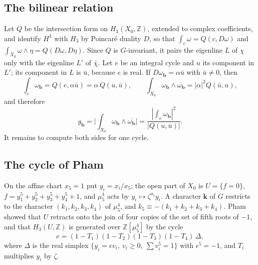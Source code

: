 \documentclass[11pt]{amsart}
\theoremstyle{definition}
\theoremstyle{remark}
\newcommand{\Z}{\mathbb{Z}}
\newcommand{\bb}{\mathbf{b}}
\begin{document}
\subsection{The bilinear relation}

Let $Q$ be the intersection form on $H_3(X_0,\Z)$, extended to complex
coefficients, and identify $H^3$ with $H_3$ by Poincar\'e duality $D$, so
that $\int_c\omega=Q(c,D\omega)$ and $\int_{X_0}\omega\wedge\eta=
Q(D\omega,D\eta)$. Since $Q$ is $G$-invariant, it pairs the eigenline $L$ of
$\chi$ only with the eigenline $L'$ of $\bar\chi$. Let $e$ be an integral
cycle and $u$ its component in $L'$; its component in $L$ is $\bar u$,
because $e$ is real. If $D\omega_{\bb}=\alpha\bar u$ with $\bar u\ne0$, then
\[
\int_e\omega_{\bb}=Q(e,\alpha\bar u)=\alpha\,Q(u,\bar u),\qquad
\int_{X_0}\omega_{\bb}\wedge\overline{\omega_{\bb}}=|\alpha|^2Q(\bar u,u),
\]
and therefore
\begin{equation}\label{eq:bilinear}
g_{\bb}=\Big|\int_{X_0}\omega_{\bb}\wedge\overline{\omega_{\bb}}\Big|
=\frac{|\int_e\omega_{\bb}|^2}{|Q(u,\bar u)|}.
\end{equation}
It remains to compute both sides for one cycle.

\subsection{The cycle of Pham}

On the affine chart $x_5=1$ put $y_i=x_i/x_5$; the open part of $X_0$ is
$U=\{f=0\}$, $f=y_1^5+y_2^5+y_3^5+y_4^5+1$, and $\mu_5^4$ acts by
$y_i\mapsto\zeta^{a_i}y_i$. A character $\mathbf k$ of $G$ restricts to the
character $(k_1,k_2,k_3,k_4)$ of $\mu_5^4$, and $k_5\equiv-(k_1+k_2+k_3+
k_4)$. Pham~\cite{Pha65} showed that $U$ retracts onto the join of four
copies of the set of fifth roots of $-1$, and that $H_3(U,\Z)$ is generated
over $\Z[\mu_5^4]$ by the cycle
\[
e=(1-T_1)(1-T_2)(1-T_3)(1-T_4)\,\Delta,
\]
where $\Delta$ is the real simplex $\{y_i=\epsilon v_i,\ v_i\ge0,\
\sum v_i^5=1\}$ with $\epsilon^5=-1$, and $T_i$ multiplies $y_i$ by
$\zeta$.
\end{document}
